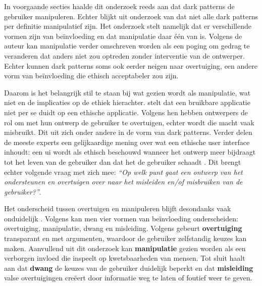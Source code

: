 \vspace{1em}

In voorgaande secties haalde dit onderzoek reeds aan dat dark patterns de gebruiker manipuleren. Echter blijkt uit onderzoek van \textcite{Kitkowska2023} dat niet alle dark patterns per definitie manipulatief zijn. Het onderzoek stelt namelijk dat er verschillende vormen zijn van beïnvloeding en dat manipulatie daar één van is. Volgens de auteur kan manipulatie verder omschreven worden als een poging om gedrag te veranderen dat anders niet zou optreden zonder interventie van de ontwerper. Echter kunnen dark patterns soms ook eerder neigen naar overtuiging, een andere vorm van beïnvloeding die ethisch acceptabeler zou zijn.

\vspace{1em}

Daarom is het belangrijk stil te staan bij wat gezien wordt als manipulatie, wat niet en de implicaties op de ethiek hierachter. \textcite{DiGeronimo2020} stelt dat een bruikbare applicatie niet per se duidt op een ethische applicatie. Volgens hen hebben ontwerpers de rol om met hun ontwerp de gebruiker te overtuigen, echter wordt die macht vaak misbruikt. Dit uit zich onder andere in de vorm van dark patterns. Verder delen de meeste experts een gelijkaardige mening over wat een ethische user interface inhoudt: een \acrshort{ui} wordt als ethisch beschouwd wanneer het ontwerp meer bijdraagt tot het leven van de gebruiker dan dat het de gebruiker schaadt \autocite{DiGeronimo2020}. Dit brengt echter volgende vraag met zich mee: \emph{``Op welk punt gaat een ontwerp van het ondersteunen en overtuigen over naar het misleiden en/of misbruiken van de gebruiker?''}. 

\vspace{1em}

Het onderscheid tussen overtuigen en manipuleren blijft desondanks vaak onduidelijk \autocite{SanchezChamorro2023, Kitkowska2023}. Volgens \textcite{SanchezChamorro2023} kan men vier vormen van beïnvloeding onderscheiden: overtuiging, manipulatie, dwang en misleiding. Volgens \textcite{SanchezChamorro2023} gebeurt \textbf{overtuiging} transparant en met argumenten, waardoor de gebruiker zelfstandig keuzes kan maken. Aanvullend uit dit onderzoek kan \textbf{manipulatie} gezien worden als een verborgen invloed die inspeelt op kwetsbaarheden van mensen. Tot sluit haalt \textcite{SanchezChamorro2023} aan dat \textbf{dwang} de keuzes van de gebruiker duidelijk beperkt en dat \textbf{misleiding} valse overtuigingen creëert door informatie weg te laten of foutief weer te geven.

